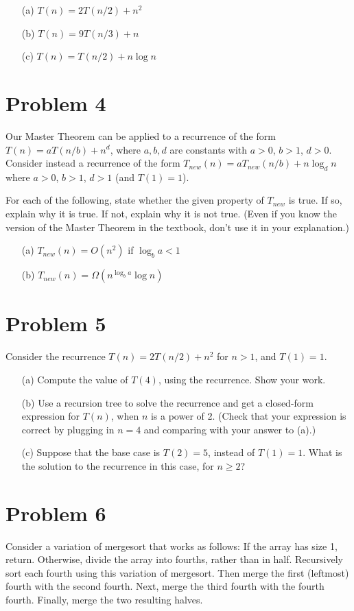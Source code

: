 \documentclass{article}
\begin{document}
\begin{enumerate}
    \item[(a)] $T(n) = 2T(n/2) + n^2$
    \item[(b)] $T(n) = 9T(n/3) + n$
    \item[(c)] $T(n) = T(n/2) + n \log n$
\end{enumerate}

\section*{Problem 4}
Our Master Theorem can be applied to a recurrence of the form $T(n) = aT(n/b) + n^d$, where $a, b, d$ are constants with $a > 0$, $b > 1$, $d > 0$. Consider instead a recurrence of the form $T_{new}(n) = aT_{new}(n/b) + n \log_d n$ where $a > 0$, $b > 1$, $d > 1$ (and $T(1) = 1$).

For each of the following, state whether the given property of $T_{new}$ is true. If so, explain why it is true. If not, explain why it is not true. (Even if you know the version of the Master Theorem in the textbook, don’t use it in your explanation.)

\begin{enumerate}
    \item[(a)] $T_{new}(n) = O(n^2)$ if $\log_b a < 1$
    \item[(b)] $T_{new}(n) = \Omega(n^{\log_b a} \log n)$
\end{enumerate}

\section*{Problem 5}
Consider the recurrence $T(n) = 2T(n/2) + n^2$ for $n > 1$, and $T(1) = 1$.

\begin{enumerate}
    \item[(a)] Compute the value of $T(4)$, using the recurrence. Show your work.
    \item[(b)] Use a recursion tree to solve the recurrence and get a closed-form expression for $T(n)$, when $n$ is a power of 2. (Check that your expression is correct by plugging in $n = 4$ and comparing with your answer to (a).)
    \item[(c)] Suppose that the base case is $T(2) = 5$, instead of $T(1) = 1$. What is the solution to the recurrence in this case, for $n \ge 2$?
\end{enumerate}

\section*{Problem 6}
Consider a variation of mergesort that works as follows: If the array has size 1, return. Otherwise, divide the array into fourths, rather than in half. Recursively sort each fourth using this variation of mergesort. Then merge the first (leftmost) fourth with the second fourth. Next, merge the third fourth with the fourth fourth. Finally, merge the two resulting halves.
\end{document}
